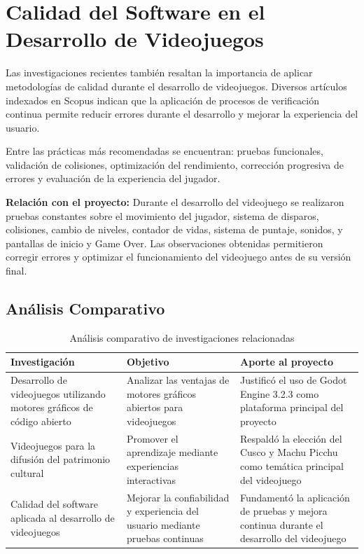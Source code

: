 \documentclass[12pt, a4paper, oneside]{report}
\begin{document}
\section{Calidad del Software en el Desarrollo de Videojuegos}

Las investigaciones recientes también resaltan la importancia de aplicar metodologías de calidad durante el desarrollo de videojuegos. Diversos artículos indexados en Scopus indican que la aplicación de procesos de verificación continua permite reducir errores durante el desarrollo y mejorar la experiencia del usuario.

Entre las prácticas más recomendadas se encuentran: pruebas funcionales, validación de colisiones, optimización del rendimiento, corrección progresiva de errores y evaluación de la experiencia del jugador.

\textbf{Relación con el proyecto:} Durante el desarrollo del videojuego se realizaron pruebas constantes sobre el movimiento del jugador, sistema de disparos, colisiones, cambio de niveles, contador de vidas, sistema de puntaje, sonidos, y pantallas de inicio y Game Over. Las observaciones obtenidas permitieron corregir errores y optimizar el funcionamiento del videojuego antes de su versión final.

\subsection{Análisis Comparativo}

\begin{table}[H]
\centering
\caption{Análisis comparativo de investigaciones relacionadas}
\label{tab:comparativo}
\small
\begin{tabular}{p{4cm} p{4.5cm} p{4.5cm}}
\toprule
\textbf{Investigación} & \textbf{Objetivo} & \textbf{Aporte al proyecto} \\
\midrule
Desarrollo de videojuegos utilizando motores gráficos de código abierto & Analizar las ventajas de motores gráficos abiertos para videojuegos & Justificó el uso de Godot Engine 3.2.3 como plataforma principal del proyecto \\
\midrule
Videojuegos para la difusión del patrimonio cultural & Promover el aprendizaje mediante experiencias interactivas & Respaldó la elección del Cusco y Machu Picchu como temática principal del videojuego \\
\midrule
Calidad del software aplicada al desarrollo de videojuegos & Mejorar la confiabilidad y experiencia del usuario mediante pruebas continuas & Fundamentó la aplicación de pruebas y mejora continua durante el desarrollo del videojuego \\
\bottomrule
\end{tabular}
\end{table}
\end{document}
